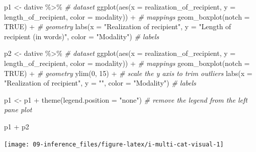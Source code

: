\documentclass[
]{article}
\newenvironment{Shaded}{\begin{snugshade}}{\end{snugshade}}
\newcommand{\AttributeTok}[1]{\textcolor[rgb]{0.77,0.63,0.00}{#1}}
\newcommand{\CommentTok}[1]{\textcolor[rgb]{0.56,0.35,0.01}{\textit{#1}}}
\newcommand{\ConstantTok}[1]{\textcolor[rgb]{0.00,0.00,0.00}{#1}}
\newcommand{\DecValTok}[1]{\textcolor[rgb]{0.00,0.00,0.81}{#1}}
\newcommand{\FunctionTok}[1]{\textcolor[rgb]{0.00,0.00,0.00}{#1}}
\newcommand{\NormalTok}[1]{#1}
\newcommand{\OtherTok}[1]{\textcolor[rgb]{0.56,0.35,0.01}{#1}}
\newcommand{\SpecialCharTok}[1]{\textcolor[rgb]{0.00,0.00,0.00}{#1}}
\newcommand{\StringTok}[1]{\textcolor[rgb]{0.31,0.60,0.02}{#1}}
\begin{document}
\begin{Shaded}
\begin{Highlighting}[]
\NormalTok{p1 }\OtherTok{\textless{}{-}} 
\NormalTok{  dative }\SpecialCharTok{\%\textgreater{}\%} \CommentTok{\# dataset}
  \FunctionTok{ggplot}\NormalTok{(}\FunctionTok{aes}\NormalTok{(}\AttributeTok{x =}\NormalTok{ realization\_of\_recipient, }\AttributeTok{y =}\NormalTok{ length\_of\_recipient, }\AttributeTok{color =}\NormalTok{ modality)) }\SpecialCharTok{+} \CommentTok{\# mappings}
  \FunctionTok{geom\_boxplot}\NormalTok{(}\AttributeTok{notch =} \ConstantTok{TRUE}\NormalTok{) }\SpecialCharTok{+} \CommentTok{\# geometry}
  \FunctionTok{labs}\NormalTok{(}\AttributeTok{x =} \StringTok{"Realization of recipient"}\NormalTok{, }\AttributeTok{y =} \StringTok{"Length of recipient (in words)"}\NormalTok{, }\AttributeTok{color =} \StringTok{"Modality"}\NormalTok{) }\CommentTok{\# labels}

\NormalTok{p2 }\OtherTok{\textless{}{-}} 
\NormalTok{  dative }\SpecialCharTok{\%\textgreater{}\%} \CommentTok{\# dataset}
  \FunctionTok{ggplot}\NormalTok{(}\FunctionTok{aes}\NormalTok{(}\AttributeTok{x =}\NormalTok{ realization\_of\_recipient, }\AttributeTok{y =}\NormalTok{ length\_of\_recipient, }\AttributeTok{color =}\NormalTok{ modality)) }\SpecialCharTok{+} \CommentTok{\# mappings}
  \FunctionTok{geom\_boxplot}\NormalTok{(}\AttributeTok{notch =} \ConstantTok{TRUE}\NormalTok{) }\SpecialCharTok{+} \CommentTok{\# geometry}
  \FunctionTok{ylim}\NormalTok{(}\DecValTok{0}\NormalTok{, }\DecValTok{15}\NormalTok{) }\SpecialCharTok{+} \CommentTok{\# scale the y axis to trim outliers}
  \FunctionTok{labs}\NormalTok{(}\AttributeTok{x =} \StringTok{"Realization of recipient"}\NormalTok{, }\AttributeTok{y =} \StringTok{""}\NormalTok{, }\AttributeTok{color =} \StringTok{"Modality"}\NormalTok{) }\CommentTok{\# labels}

\NormalTok{p1 }\OtherTok{\textless{}{-}}\NormalTok{ p1 }\SpecialCharTok{+} \FunctionTok{theme}\NormalTok{(}\AttributeTok{legend.position =} \StringTok{"none"}\NormalTok{) }\CommentTok{\# remove the legend from the left pane plot}

\NormalTok{p1 }\SpecialCharTok{+}\NormalTok{ p2}
\end{Highlighting}
\end{Shaded}

\begin{center}\texttt{[image: 09-inference\_files/figure-latex/i-multi-cat-visual-1]} \end{center}
\end{document}
